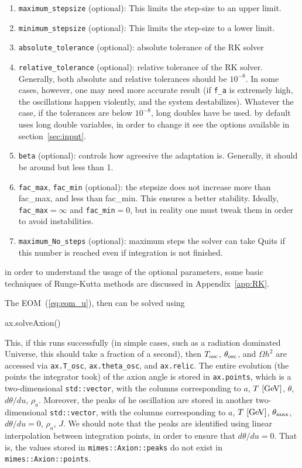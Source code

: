 \documentclass[11pt,a4paper]{article}
\begin{document}
\begin{enumerate}
	\item {\tt maximum\_stepsize} (optional): This limits the step-size to an upper limit. 
	\item {\tt minimum\_stepsize} (optional): This limits the step-size to a lower limit. 
	
	\item {\tt absolute\_tolerance} (optional): absolute tolerance of the RK solver
	
	\item {\tt relative\_tolerance} (optional): relative tolerance of the RK solver.
	Generally, both absolute and relative tolerances should be $10^{-8}$. 
	In some cases, however, one may need more accurate result (\eg if {\tt f\_a} is extremely high, 
	the oscillations happen violently, and the system destabilizes). Whatever the case, if the  
	tolerances are below $10^{-8}$, long doubles have be used. \mimes by default uses {long double} variables, 
	in order to change it see the options available in section~\ref{sec:input}.
	
	\item {\tt beta} (optional): controls how agreesive the adaptation is. Generally, it should be around but less than 1.
	
	\item {\tt fac\_max},  {\tt fac\_min} (optional): the stepsize does not increase more than fac\_max, and less than fac\_min. 
	This ensures a better stability. Ideally, {\tt fac\_max}$=\infty$ and {\tt fac\_min}$=0$, but in reality one must 
	tweak them in order to avoid instabilities.
	
	\item {\tt maximum\_No\_steps} (optional): maximum steps the solver can take Quits if this number is reached even if integration
	is not finished. 
\end{enumerate}
%
in order to understand the usage of the optional parameters, some basic techniques of Runge-Kutta methods are discussed in Appendix~\ref{app:RK}. 

The EOM~(\ref{eq:eom_u}), then can be solved using 
%
\begin{cpp}
	ax.solveAxion()
\end{cpp}
%
This, if this runs successfully (in simple cases, such as a radiation dominated Universe, this should take a fraction of a second), then  $T_{\rm osc}{}$, $\theta_{\rm osc}{}$, and $\Omega h^2$ are accessed via {\tt ax.T\_osc}, {\tt ax.theta\_osc}, and {\tt ax.relic}. The entire evolution (the points the integrator took) of the axion angle is stored in {\tt ax.points}, which is a two-dimensional {\tt std::vector}, with the columns corresponding to  $a$, $T~[{\rm GeV}]$, 
$\theta$, $d\theta/du$, $\rho_a$. Moreover, the peaks of he oscillation are stored in another two-dimensional {\tt std::vector}, with the columns corresponding to $a$, $T~[{\rm GeV}]$, $\theta_{\rm max}{}$, $d\theta/du=0$, $\rho_a$, $J$. We should note that the peaks are identified using linear interpolation between integration points, in order to ensure that $d\theta/du = 0$. That is, the values stored in {\tt mimes::Axion::peaks} do not exist in {\tt mimes::Axion::points}.
\end{document}
